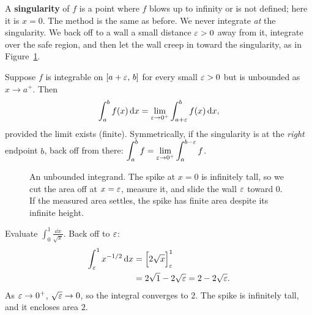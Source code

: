 A \textbf{singularity} of $f$ is a point where $f$ blows up to infinity or is not
defined; here it is $x=0$. The method is the same as before. We never integrate
\emph{at} the singularity. We back off to a wall a small distance $\varepsilon>0$ away
from it, integrate over the safe region, and then let the wall creep in toward
the singularity, as in Figure~\ref{ch25:fig-spike}.

\begin{definition}
\label{ch25:def-second-kind}
Suppose $f$ is integrable on $[a+\varepsilon,\,b]$ for every small $\varepsilon>0$ but is
unbounded as $x\to a^+$. Then
\[
  \int_a^{b} f(x)\,\mathrm{d} x
  = \lim_{\varepsilon\to 0^+}\int_{a+\varepsilon}^{b} f(x)\,\mathrm{d} x,
\]
provided the limit exists (finite). Symmetrically, if the singularity is at the
\emph{right} endpoint $b$, back off from there:
$\displaystyle \int_a^{b} f = \lim_{\varepsilon\to 0^+}\int_a^{b-\varepsilon} f$.
\end{definition}

\begin{figure}[H]
\centering
{}
\caption{An unbounded integrand. The spike at $x=0$ is infinitely tall, so we cut
the area off at $x=\varepsilon$, measure it, and slide the wall $\varepsilon$ toward $0$. If the
measured area settles, the spike has finite area despite its infinite height.}
\label{ch25:fig-spike}
\end{figure}

\begin{example}
\label{ch25:ex-sqrt}
Evaluate $\displaystyle\int_0^{1}\frac{\dd x}{\sqrt{x}}$. Back off to $\varepsilon$:
\begin{align*}
  \int_{\varepsilon}^{1} x^{-1/2}\,\mathrm{d} x
  &= \Big[2\sqrt{x}\Big]_{\varepsilon}^{1}\\
  &= 2\sqrt{1} - 2\sqrt{\varepsilon}
   = 2 - 2\sqrt{\varepsilon}.
\end{align*}
As $\varepsilon\to 0^+$, $\sqrt{\varepsilon}\to 0$, so the integral converges to $2$. The spike is
infinitely tall, and it encloses area $2$.
\end{example}

